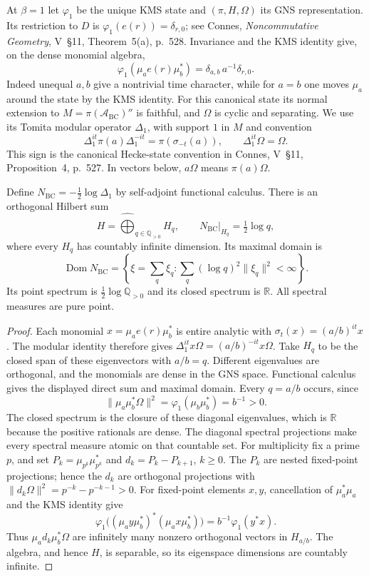 At $\beta=1$ let $\varphi_1$ be the unique KMS state and
$(\pi,H,\Omega)$ its GNS representation. Its restriction to $D$ is
$\varphi_1(e(r))=\delta_{r,0}$; see Connes,
\emph{Noncommutative Geometry}, V~\S11, Theorem~5(a), p.~528.
Invariance and the KMS identity give, on the dense monomial algebra,
\[
 \varphi_1(\mu_a e(r)\mu_b^*)
       =\delta_{a,b}\,a^{-1}\delta_{r,0}.
\]
Indeed unequal $a,b$ give a nontrivial time character, while for
$a=b$ one moves $\mu_a$ around the state by the KMS identity.
For this canonical state its normal extension to
$M=\pi(\mathcal A_{\mathrm{BC}})''$ is faithful, and $\Omega$ is
cyclic and separating. We use its Tomita modular operator $\Delta_1$,
with support $1$ in $M$ and convention
\[
 \Delta_1^{it}\pi(a)\Delta_1^{-it}=\pi(\sigma_{-t}(a)),
 \qquad \Delta_1^{it}\Omega=\Omega.
\]
This sign is the canonical Hecke-state convention in Connes,
V~\S11, Proposition~4, p.~527. In vectors below, $a\Omega$ means
$\pi(a)\Omega$.

\begin{theorem}
\label{v4-arith:w5-direct:thm:HPAr-elementary}
Define $N_{\mathrm{BC}}=-\tfrac12\log\Delta_1$ by self-adjoint
functional calculus. There is an orthogonal Hilbert sum
\[
 H=\widehat{\bigoplus}_{q\in\mathbb Q_{>0}}H_q,
 \qquad N_{\mathrm{BC}}|_{H_q}=\tfrac12\log q,
\]
where every $H_q$ has countably infinite dimension. Its maximal domain is
\[
 \operatorname{Dom}N_{\mathrm{BC}}
 =\left\{\xi=\sum_q\xi_q:
            \sum_q(\log q)^2\|\xi_q\|^2<\infty\right\}.
\]
Its point spectrum is $\tfrac12\log\mathbb Q_{>0}$ and its closed
spectrum is $\mathbb R$. All spectral measures are pure point.
\end{theorem}
\begin{proof}
Each monomial $x=\mu_a e(r)\mu_b^*$ is entire analytic with
$\sigma_t(x)=(a/b)^{it}x$. The modular identity therefore gives
$\Delta_1^{it}x\Omega=(a/b)^{-it}x\Omega$.
Take $H_q$ to be the closed span of these eigenvectors with $a/b=q$.
Different eigenvalues are orthogonal, and the monomials are dense
in the GNS space. Functional calculus gives the displayed direct
sum and maximal domain. Every $q=a/b$ occurs, since
\[
 \|\mu_a\mu_b^*\Omega\|^2
       =\varphi_1(\mu_b\mu_b^*)=b^{-1}>0.
\]
The closed spectrum is the closure of these diagonal eigenvalues,
which is $\mathbb R$ because the positive rationals are dense.
The diagonal spectral projections make every spectral measure
atomic on that countable set.
For multiplicity fix a prime $p$, and set
$P_k=\mu_{p^k}\mu_{p^k}^*$ and $d_k=P_k-P_{k+1}$, $k\ge0$.
The $P_k$ are nested fixed-point projections; hence the $d_k$ are
orthogonal projections with
$\|d_k\Omega\|^2=p^{-k}-p^{-k-1}>0$.
For fixed-point elements $x,y$, cancellation of $\mu_a^*\mu_a$ and
the KMS identity give
\[
 \varphi_1\bigl((\mu_a y\mu_b^*)^*(\mu_a x\mu_b^*)\bigr)
     =b^{-1}\varphi_1(y^*x).
\]
Thus $\mu_a d_k\mu_b^*\Omega$ are infinitely many nonzero orthogonal
vectors in $H_{a/b}$. The algebra, and hence $H$, is separable,
so its eigenspace dimensions are countably infinite.
\end{proof}

